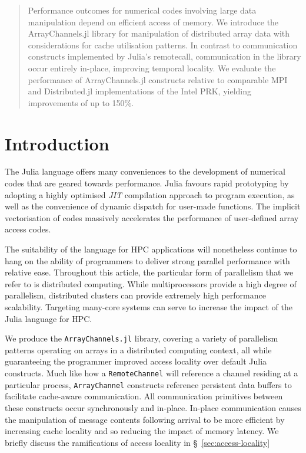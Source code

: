 \documentclass{juliacon}
\begin{document}


\maketitle

\begin{abstract}
Performance outcomes for numerical codes involving large data
manipulation depend on efficient access of memory. We introduce the ArrayChannels.jl library for
manipulation of distributed array data with considerations for cache
utilisation patterns. In contrast to communication constructs
implemented by Julia's remotecall, communication in
the library occur entirely in-place, improving temporal locality. We evaluate the
performance of ArrayChannels.jl constructs relative to
comparable MPI and Distributed.jl implementations of the Intel
PRK, yielding improvements of up to 150\%.
\end{abstract}

\section{Introduction}
The Julia language offers many conveniences to the development of
numerical codes that are geared towards performance. Julia favours rapid
prototyping by adopting a highly optimised \textit{JIT} compilation approach to
program execution, as well as the convenience of dynamic dispatch for
user-made functions. The implicit vectorisation of codes massively
accelerates the performance of user-defined array access codes.

The suitability of the language for HPC applications will nonetheless
continue to hang on the ability of programmers to deliver strong
parallel performance with relative ease. Throughout this article, the
particular form of parallelism that we refer to is distributed
computing. While multiprocessors provide a high degree of parallelism, distributed clusters can provide extremely high performance scalability. Targeting many-core systems can serve to increase the impact of the Julia language for HPC.

We produce the \texttt{ArrayChannels.jl} library, covering a variety of
parallelism patterns operating on arrays in a distributed computing
context, all while guaranteeing the programmer improved access locality
over default Julia constructs. Much like how a \texttt{RemoteChannel} will reference a channel residing at a particular process, \texttt{ArrayChannel} constructs reference persistent data buffers to facilitate cache-aware communication.
All communication primitives between these
constructs occur synchronously and in-place. In-place communication
causes the manipulation of message contents following arrival to be more
efficient by increasing cache locality and so reducing the impact of
memory latency. We briefly discuss the ramifications of access locality in
\S~\ref{sec:access-locality}
\end{document}
